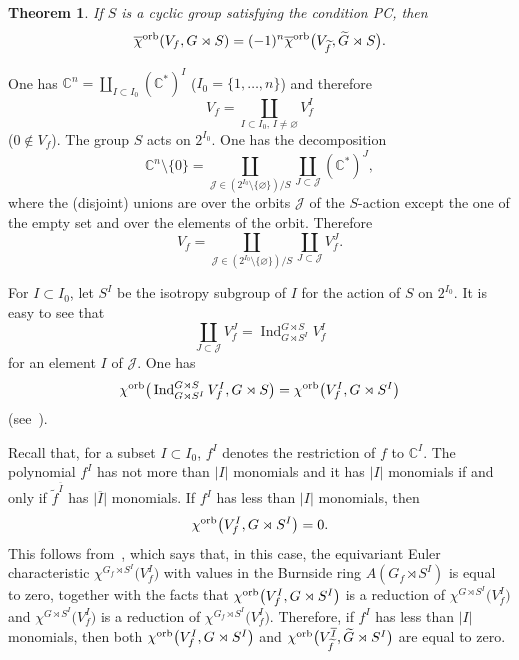 \documentclass[pdftex]{sigma}
\numberwithin{equation}{section}
\newtheorem{Theorem}{Theorem}[section]
\begin{document}
\begin{Theorem}\label{theo:Main} If $S$ is a cyclic group satisfying the condition PC, then
 \begin{gather}\label{eqn:Main}
 {\overline{\chi}}^{ \rm orb}(V_f,G \rtimes S)=(-1)^n {\overline{\chi}}^{ \rm orb}\big(V_{\widetilde{f}},\widetilde{G} \rtimes S\big) .
 \end{gather}
\end{Theorem}

One has ${\mathbb C}^n=\coprod_{I\subset I_0}({\mathbb C}^*)^I$ ($I_0=\{1,\dots, n\}$) and therefore
\[V_f=\coprod_{I\subset I_0,\, I\ne\varnothing} V_f^I
\]
($0\notin V_f$). The group $S$ acts on
$2^{I_0}$. One has the decomposition
\[
{\mathbb C}^n \setminus \{ 0 \} =\coprod_{{\mathcal J}\in\left(2^{I_0}\setminus\{\varnothing\}\right)/S}\coprod_{J\subset {\mathcal J}}({\mathbb C}^*)^J,
\]
where the (disjoint)
unions are over the orbits ${\mathcal J}$ of the $S$-action except the one of the empty set and over the elements of
the orbit. Therefore
\[
V_f=\coprod_{{\mathcal J}\in\left(2^{I_0}\setminus\{\varnothing\}\right)/S}\coprod_{J\subset {\mathcal J}}V_f^J.
\]

For $I\subset I_0$, let $S^I$ be the isotropy subgroup of $I$ for the action of $S$ on $2^{I_0}$. It is easy to see that
\[
\coprod_{J\subset {\mathcal J}}V_f^J=\operatorname{Ind}_{G\rtimes S^I}^{G\rtimes S} V_f^I
\]
for an element $I$ of ${\mathcal J}$. One has
\[
{\chi}^{\rm orb}\big(\operatorname{Ind}_{G\rtimes S^I}^{G\rtimes S} V_f^I, G\rtimes S\big)=
{\chi}^{\rm orb}\big(V_f^I, G\rtimes S^I\big)
\]
(see~\cite[Theorem~1]{GLM}).

Recall that, for a subset $I\subset I_0$, $f^I$ denotes the restriction of $f$ to ${\mathbb C}^I$. The polynomial $f^I$ has
not more than $\vert I\vert$ monomials and it has $\vert I\vert$ monomials if and only if
$\widetilde{f}^{\overline{I}}$ has $\vert \overline{I}\vert$ monomials. If $f^I$ has less than $\vert I\vert$
monomials, then
\[
{\chi}^{\rm orb}\big(V_f^I, G\rtimes S^I\big)=0 .
\]
This follows from~\cite[Lemma~1]{EG-IMRN}, which says that, in this case, the equivariant Euler characteristic $\chi^{G_f\rtimes S^I}\big(V_f^I\big)$ with values in the Burnside ring $A(G_f\rtimes S^I)$ is equal to zero, together with the facts that ${\chi}^{\rm orb}\big(V_f^I, G\rtimes S^I\big)$ is a reduction of $\chi^{G\rtimes S^I}\big(V_f^I\big)$ and $\chi^{G\rtimes S^I}\big(V_f^I\big)$ is a reduction of $\chi^{G_f\rtimes S^I}\big(V_f^I\big)$. Therefore, if $f^I$ has less than $\vert I\vert$ monomials, then both ${\chi}^{\rm orb}\big(V_f^I, G\rtimes S^I\big)$ and ${\chi}^{\rm orb}\big(V_{\widetilde{f}}^{\overline{I}}, \widetilde{G}\rtimes S^I\big)$ are equal to zero.
\end{document}
